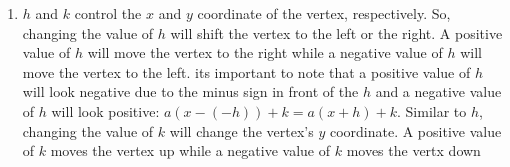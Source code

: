 \documentclass[addpoints]{exam}
\begin{document}
\begin{tcolorbox}[breakable, title=QUADRATIC FUNCTIONS, colframe=black, sharp corners, colback=white, colbacktitle=white, coltitle=black]
\begin{enumerate}
\begin{minipage}{0.45\linewidth}
      \end{minipage}

      \item $h$ and $k$ control the $x$ and $y$ coordinate of the vertex, respectively. So, changing the value of $h$ will shift the vertex to the left or the right. A positive value of $h$ will move the vertex to the right while a negative value of $h$ will move the vertex to the left. its important to note that a positive value of $h$ will look negative due to the minus sign in front of the $h$ and a negative value of $h$ will look positive: $a\left(x-\left(-h\right)\right)+k = a\left(x+h\right)+k$. Similar to $h$, changing the value of $k$ will change the vertex's $y$ coordinate. A positive value of $k$ moves the vertex up while a negative value of $k$ moves the vertx down
    \end{enumerate}
  \end{tcolorbox}
\end{document}
